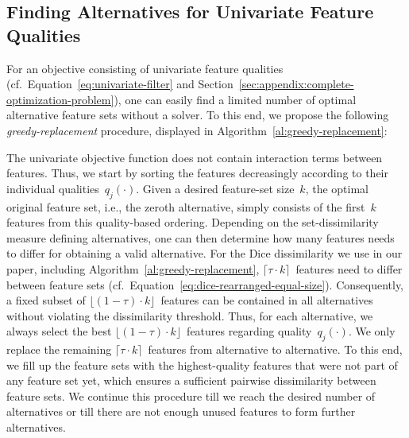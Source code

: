 \documentclass{article}
\theoremstyle{definition}
\begin{document}
\subsection{Finding Alternatives for Univariate Feature Qualities}
\label{sec:appendix:univariate-search-algorithm}

For an objective consisting of univariate feature qualities (cf.~Equation~\ref{eq:univariate-filter} and Section~\ref{sec:appendix:complete-optimization-problem}), one can easily find a limited number of optimal alternative feature sets without a solver.
To this end, we propose the following \emph{greedy-replacement} procedure, displayed in Algorithm~\ref{al:greedy-replacement}:

The univariate objective function does not contain interaction terms between features.
Thus, we start by sorting the features decreasingly according to their individual qualities~$q_j(\cdot)$.
Given a desired feature-set size~$k$, the optimal original feature set, i.e., the zeroth alternative, simply consists of the first~$k$ features from this quality-based ordering.
Depending on the set-dissimilarity measure defining alternatives, one can then determine how many features needs to differ for obtaining a valid alternative.
For the Dice dissimilarity we use in our paper, including Algorithm~\ref{al:greedy-replacement}, $\lceil \tau \cdot k \rceil$~features need to differ between feature sets (cf.~Equation~\ref{eq:dice-rearranged-equal-size}).
Consequently, a fixed subset of $\lfloor (1 - \tau) \cdot k \rfloor$~features can be contained in all alternatives without violating the dissimilarity threshold.
Thus, for each alternative, we always select the best $\lfloor (1 - \tau) \cdot k \rfloor$~features regarding quality~$q_j(\cdot)$.
We only replace the remaining $\lceil \tau \cdot k \rceil$~features from alternative to alternative.
To this end, we fill up the feature sets with the highest-quality features that were not part of any feature set yet, which ensures a sufficient pairwise dissimilarity between feature sets.
We continue this procedure till we reach the desired number of alternatives or till there are not enough unused features to form further alternatives.
\end{document}
